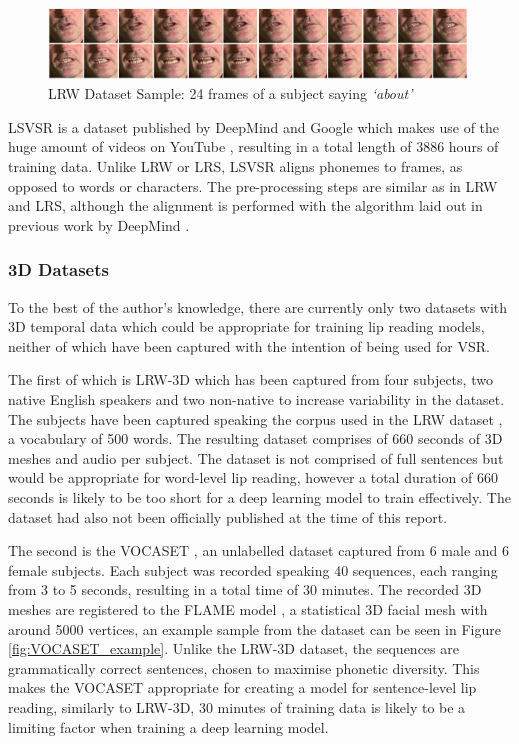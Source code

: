 \begin{figure}[h]
    \centering
        \includegraphics[width=0.99\textwidth]{figures/lrw_one_second.png}
    \caption{LRW Dataset Sample: 24 frames of a subject saying \textit{`about'} \cite{Chung2016}}\label{fig:LRW_One_Second}
\end{figure}

LSVSR is a dataset published by DeepMind and Google which makes use of the huge amount of videos on YouTube \cite{Shillingford2018}, resulting in a total length of 3886 hours of training data.
Unlike LRW or LRS, LSVSR aligns phonemes to frames, as opposed to words or characters.
The pre-processing steps are similar as in LRW and LRS, although the alignment is performed with the algorithm laid out in previous work by DeepMind \cite{Liao2013}.

\subsubsection{3D Datasets} \label{3D Datasets}
To the best of the author's knowledge, there are currently only two datasets with 3D temporal data which could be appropriate for training lip reading models, neither of which have been captured with the intention of being used for VSR.

The first of which is LRW-3D \cite{Tzirakis2019} which has been captured from four subjects, two native English speakers and two non-native to increase variability in the dataset.
The subjects have been captured speaking the corpus used in the LRW dataset \cite{Chung2016}, a vocabulary of 500 words.
The resulting dataset comprises of 660 seconds of 3D meshes and audio per subject.
The dataset is not comprised of full sentences but would be appropriate for word-level lip reading, however a total duration of 660 seconds is likely to be too short for a deep learning model to train effectively.
The dataset had also not been officially published at the time of this report.

The second is the VOCASET \cite{Cudeiro2019}, an unlabelled dataset captured from 6 male and 6 female subjects.
Each subject was recorded speaking 40 sequences, each ranging from 3 to 5 seconds, resulting in a total time of 30 minutes.
The recorded 3D meshes are registered to the FLAME model \cite{Li2017}, a statistical 3D facial mesh with around 5000 vertices, an example sample from the dataset can be seen in Figure \ref{fig:VOCASET_example}.
Unlike the LRW-3D dataset, the sequences are grammatically correct sentences, chosen to maximise phonetic diversity.
This makes the VOCASET appropriate for creating a model for sentence-level lip reading, similarly to LRW-3D, 30 minutes of training data is likely to be a limiting factor when training a deep learning model.

